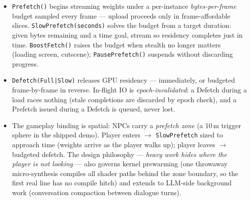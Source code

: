 \documentclass[11pt,a4paper]{article}
\newcommand{\code}[1]{\texttt{#1}}
\begin{document}
\begin{itemize}[leftmargin=2em]
\item \code{Prefetch()} begins streaming weights under a per-instance
\emph{bytes-per-frame} budget sampled every frame --- upload proceeds only in
frame-affordable slices. \code{SlowPrefetch(seconds)} solves the budget from a target
duration: given bytes remaining and a time goal, stream so residency completes just in
time. \code{BoostFetch()} raises the budget when stealth no longer matters (loading
screen, cutscene); \code{PausePrefetch()} suspends without discarding progress.
\item \code{Defetch(Full|Slow)} releases GPU residency --- immediately, or budgeted
frame-by-frame in reverse. In-flight IO is \emph{epoch-invalidated}: a Defetch during a
load races nothing (stale completions are discarded by epoch check), and a Prefetch
issued during a Defetch is queued, never lost.
\item The gameplay binding is spatial: NPCs carry a \emph{prefetch zone} (a 10\,m
trigger sphere in the shipped demo). Player enters $\to$ \code{SlowPrefetch} sized to
approach time (weights arrive as the player walks up); player leaves $\to$ budgeted
defetch. The design philosophy --- \emph{heavy work hides where the player is not
looking} --- also governs kernel prewarming (one throwaway micro-synthesis compiles all
shader paths behind the zone boundary, so the first real line has no compile hitch) and
extends to LLM-side background work (conversation compaction between dialogue turns).
\end{itemize}
\end{document}
